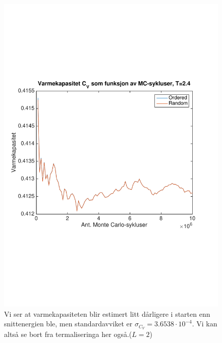 \documentclass[norsk, 10pt]{article}
\begin{document}
\begin{figure}[H]
\centering
\includegraphics[scale = 0.5, trim = 1cm 8cm 1cm 8cm]{b_varmekap_MC_L2_T24.pdf}
\caption{Vi ser at varmekapasiteten blir estimert litt dårligere i starten enn snittenergien ble, men standardavviket er $\sigma_{C_V} = 3.6538\cdot10^{-4}$. Vi kan altså se bort fra termaliseringa her også.($L=2$)}
\label{fig:varmekapT24}
\end{figure}
\end{document}
